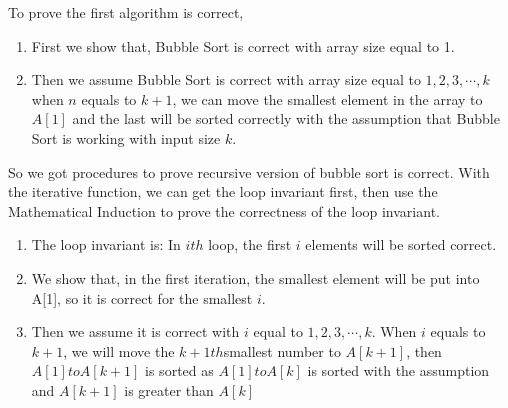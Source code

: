 \documentclass[usletter]{article}
\begin{document}
\noindent
To prove the first algorithm is correct,
\begin{enumerate}
  \item First we show that, Bubble Sort is correct with array size equal to 1.
  \item Then we assume Bubble Sort is correct with array size equal to $1, 2, 3, \cdots, k$ when $n$ equals to $k+1$, we can move the
  smallest element in the array to $A[1]$ and the last will be sorted correctly with the assumption that Bubble Sort is working with input size $k$.
\end{enumerate}

So we got procedures to prove recursive version of bubble sort is correct. With the iterative function, we can get the loop invariant first, then use the Mathematical Induction to prove the correctness of the loop invariant.

\begin{enumerate}
  \item The loop invariant is: In $ith$ loop, the first $i$ elements will be sorted correct.
  \item We show that, in the first iteration, the smallest element will be put into A[1], so it is correct for the smallest $i$.
  \item Then we assume it is correct with $i$ equal to $1, 2, 3, \cdots, k$. When $i$ equals to $k+1$, we will move the $k+1th$smallest number to $A[k+1]$, then $A[1] to A[k+1]$ is sorted as $A[1] to A[k]$ is sorted with the assumption and $A[k+1]$ is greater than $A[k]$
\end{enumerate}

\medskip



\end{document}
